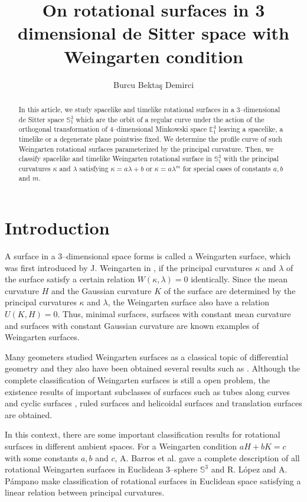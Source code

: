 \documentclass{amsart}
\title{On rotational surfaces in 3 dimensional de Sitter space with Weingarten condition}
\author[B. Bekta\c s]{Burcu Bekta\c s Demirci}
\theoremstyle{definition}
\numberwithin{equation}{section}
\begin{document}
\maketitle
\begin{abstract}
In this article, we study spacelike and timelike rotational surfaces in a 3--dimensional de Sitter space $\mathbb{S}^3_1$ which are the
orbit of a regular curve under the action of the orthogonal
transformation of 4--dimensional Minkowski space $\mathbb{E}^4_1$ leaving 
a spacelike, a timelike or a degenerate plane pointwise fixed. 
We determine the profile curve of 
such Weingarten rotational surfaces parameterized by the principal curvature. 
Then, we classify spacelike and timelike Weingarten rotational surface in $\mathbb{S}^3_1$ 
with the principal curvatures $\kappa$ and $\lambda$ satisfying $\kappa=a\lambda+b$ or $\kappa=a\lambda^m$ for 
special cases of constants $a, b$ and $m$.
\end{abstract}

\section{Introduction}
A surface in a 3--dimensional space forms is called a Weingarten surface, which was first introduced by J. Weingarten in \cite{JW}, if the principal curvatures $\kappa$ and $\lambda$ of the surface satisfy a certain relation $W(\kappa,\lambda)=0$ identically.
Since the mean curvature $H$ and the Gaussian curvature $K$ of the surface are determined by the principal curvatures 
$\kappa$ and $\lambda$, the Weingarten surface also have 
a relation $U(K,H)=0$. 
Thus, minimal surfaces, surfaces with constant mean curvature and surfaces with constant Gaussian curvature are known examples of Weingarten surfaces. 

Many geometers studied Weingarten surfaces as a classical topic of differential geometry and they also have been obtained several results such as 
\cite{HW, RE, KS, L1, L2, L3, Li, Y}. 
Although the complete classification of Weingarten surfaces is still a open problem, the existence results of  
important subclasses of surfaces such as  
tubes along curves and cyclic surfaces \cite{L2,L3}, 
ruled surfaces and helicoidal surfaces \cite{K,DK} and  translation surfaces \cite{DGW, LM} are obtained. 

In this context, 
there are some important classification results for 
rotational surfaces in different ambient spaces. 
For a Weingarten condition $aH+bK=c$ with some constants $a,b$ and $c$, A. Barros et al. \cite{Barros} gave a complete description of all rotational Weingarten surfaces in Euclidean 3--sphere $\mathbb{S}^3$
and R. L\'{o}pez and A. P\'{a}mpano \cite{Lopez} 
make classification of rotational surfaces in Euclidean space satisfying a linear relation between principal curvatures. 
\end{document}
